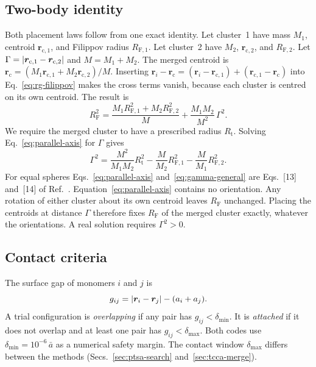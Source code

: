 \documentclass[11pt,a4paper]{article}
\newcommand{\abar}{\bar{a}}
\newcommand{\RF}{R_\text{F}}
\newcommand{\dmin}{\delta_\text{min}}
\newcommand{\dmax}{\delta_\text{max}}
\begin{document}
\subsection{Two-body identity}
\label{sec:identity}

Both placement laws follow from one exact identity.
Let cluster~1 have mass $M_1$, centroid $\bm{r}_{\text{c},1}$, and Filippov radius $R_{\text{F},1}$.
Let cluster~2 have $M_2$, $\bm{r}_{\text{c},2}$, and $R_{\text{F},2}$.
Let $\Gamma = \abs{\bm{r}_{\text{c},1} - \bm{r}_{\text{c},2}}$ and $M = M_1 + M_2$.
The merged centroid is $\bm{r}_\text{c} = (M_1 \bm{r}_{\text{c},1} + M_2 \bm{r}_{\text{c},2})/M$.
Inserting $\bm{r}_i - \bm{r}_\text{c} = (\bm{r}_i - \bm{r}_{\text{c},1}) + (\bm{r}_{\text{c},1} - \bm{r}_\text{c})$ into Eq.~\eqref{eq:rg-filippov} makes the cross terms vanish, because each cluster is centred on its own centroid.
The result is
\begin{equation}
  \RF^2 = \frac{M_1 R_{\text{F},1}^2 + M_2 R_{\text{F},2}^2}{M}
        + \frac{M_1 M_2}{M^2}\,\Gamma^2 .
  \label{eq:parallel-axis}
\end{equation}
We require the merged cluster to have a prescribed radius $R_\text{t}$.
Solving Eq.~\eqref{eq:parallel-axis} for $\Gamma$ gives
\begin{equation}
  \Gamma^2 = \frac{M^2}{M_1 M_2} R_\text{t}^2
           - \frac{M}{M_2} R_{\text{F},1}^2
           - \frac{M}{M_1} R_{\text{F},2}^2 .
  \label{eq:gamma-general}
\end{equation}
For equal spheres Eqs.~\eqref{eq:parallel-axis} and~\eqref{eq:gamma-general} are Eqs.~[13] and~[14] of Ref.~\cite{filippov2000}.
Equation~\eqref{eq:parallel-axis} contains no orientation.
Any rotation of either cluster about its own centroid leaves $\RF$ unchanged.
Placing the centroids at distance $\Gamma$ therefore fixes $\RF$ of the merged cluster exactly, whatever the orientations.
A real solution requires $\Gamma^2 > 0$.

\subsection{Contact criteria}
\label{sec:contact}

The surface gap of monomers $i$ and $j$ is
\begin{equation}
  g_{ij} = \abs{\bm{r}_i - \bm{r}_j} - (a_i + a_j) .
  \label{eq:gap}
\end{equation}
A trial configuration is \emph{overlapping} if any pair has $g_{ij} < \dmin$.
It is \emph{attached} if it does not overlap and at least one pair has $g_{ij} < \dmax$.
Both codes use $\dmin = 10^{-6}\,\abar$ as a numerical safety margin.
The contact window $\dmax$ differs between the methods (Secs.~\ref{sec:ptsa-search} and~\ref{sec:tcca-merge}).
\end{document}
